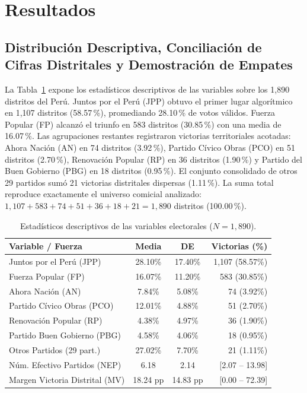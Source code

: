 \documentclass[conference,10pt,letterpaper]{IEEEtran}
\begin{document}
\section{Resultados}

\subsection{Distribución Descriptiva, Conciliación de Cifras Distritales y Demostración de Empates}

La Tabla~\ref{tab:descriptivos} expone los estadísticos descriptivos de las variables sobre los 1,890 distritos del Perú. Juntos por el Perú (JPP) obtuvo el primer lugar algorítmico en 1,107 distritos (58.57\,\%), promediando 28.10\,\% de votos válidos. Fuerza Popular (FP) alcanzó el triunfo en 583 distritos (30.85\,\%) con una media de 16.07\,\%. Las agrupaciones restantes registraron victorias territoriales acotadas: Ahora Nación (AN) en 74 distritos (3.92\,\%), Partido Cívico Obras (PCO) en 51 distritos (2.70\,\%), Renovación Popular (RP) en 36 distritos (1.90\,\%) y Partido del Buen Gobierno (PBG) en 18 distritos (0.95\,\%). El conjunto consolidado de otros 29 partidos sumó 21 victorias distritales dispersas (1.11\,\%). La suma total reproduce exactamente el universo comicial analizado: $1,107 + 583 + 74 + 51 + 36 + 18 + 21 = 1,890$ distritos (100.00\,\%).

\begin{table}[htbp]
\centering
\caption{Estadísticos descriptivos de las variables electorales ($N = 1,890$).}
\label{tab:descriptivos}
\footnotesize
\begin{tabularx}{\columnwidth}{X c c r}
\toprule
\textbf{Variable / Fuerza} & \textbf{Media} & \textbf{DE} & \textbf{Victorias (\%)} \\
\midrule
Juntos por el Perú (JPP) & 28.10\% & 17.40\% & 1,107 (58.57\%) \\
Fuerza Popular (FP) & 16.07\% & 11.20\% & 583 (30.85\%) \\
Ahora Nación (AN) & 7.84\% & 5.08\% & 74 (3.92\%) \\
Partido Cívico Obras (PCO) & 12.01\% & 4.88\% & 51 (2.70\%) \\
Renovación Popular (RP) & 4.38\% & 4.97\% & 36 (1.90\%) \\
Partido Buen Gobierno (PBG) & 4.58\% & 4.06\% & 18 (0.95\%) \\
Otros Partidos (29 part.) & 27.02\% & 7.70\% & 21 (1.11\%) \\
\midrule
Núm. Efectivo Partidos (NEP) & 6.18 & 2.14 & [2.07 -- 13.98] \\
Margen Victoria Distrital (MV) & 18.24 pp & 14.83 pp & [0.00 -- 72.39] \\
\bottomrule
\end{tabularx}
\end{table}
\end{document}

